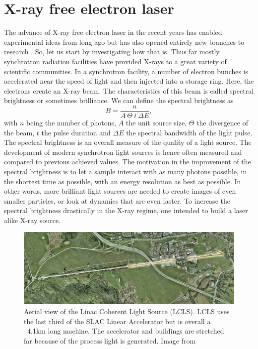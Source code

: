 \section{X-ray free electron laser}\label{sec:xfel}
The advance of X-ray free electron laser in the recent years has enabled experimental ideas from long ago but has also opened entirely new branches to research \cite{Pellegrini-2016-RMP,Bostedt-2016-RMP}. So, let us start by investigating how that is. Thus far mostly synchrotron radiation facilities have provided X-rays to a great variety of scientific communities. In a synchrotron facility, a number of electron bunches is accelerated near the speed of light and then injected into a storage ring. Here, the electrons create an X-ray beam. The characteristics of this beam is called spectral brightness \cite{Mills-2005-IUCR} or sometimes brilliance. We can define the spectral brightness as \cite{Als-Nielson-2011-JWS}
\begin{equation}
B = \frac{n}{A\ \Theta\ t\ \Delta\! E},
\label{eq:spectral-brightness}
\end{equation}
with $n$ being the number of photons, $A$ the unit source size, $\Theta$ the divergence of the beam, $t$ the pulse duration and $\Delta\! E$ the spectral bandwidth of the light pulse. The spectral brightness is an overall measure of the quality of a light source. The development of modern synchrotron light sources is hence often measured and compared to previous achieved values. The motivation in the improvement of the spectral brightness is to let a sample interact with as many photons possible, in the shortest time as possible, with an energy resolution as best as possible. In other words, more brilliant light sources are needed to create images of even smaller particles, or look at dynamics that are even faster. To increase the spectral brightness drastically in the X-ray regime, one intended to build a laser alike X-ray source. 
\begin{figure}[t]
	\centering
		\includegraphics[width=1.00\textwidth]{images/aerial-view-lcls.jpg}
	\caption{Aerial view of the Linac Coherent Light Source (LCLS). LCLS uses the last third of the SLAC Linear Accelerator but is overall a ~4.1km long machine. The accelerator and buildings are stretched far because of the process light is generated. Image from \cite{SLAC-2009-Flickr}}
	\label{fig:aerial-view-lcls}
\end{figure}
